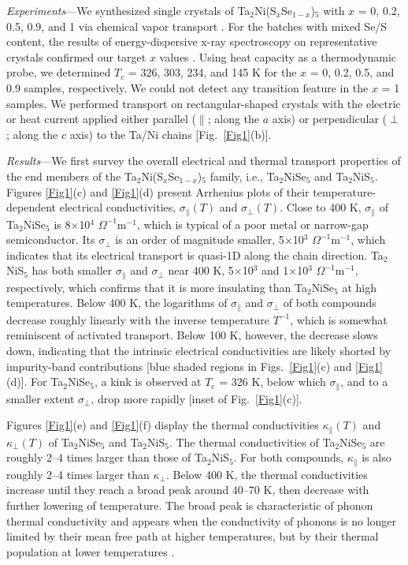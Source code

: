 \documentclass[aps,prl,twocolumn,superscriptaddress]{revtex4-2}
\begin{document}
\textit{Experiments}---We synthesized single crystals of Ta$_2$Ni(S$_x$Se$_{1-x}$)$_5$ with $x$ = 0, 0.2, 0.5, 0.9, and 1 via chemical vapor transport \cite{Lu_NatComm_2017}. For the batches with mixed Se/S content, the results of energy-dispersive x-ray spectroscopy on representative crystals confirmed our target $x$ values \cite{SM}. Using heat capacity as a thermodynamic probe, we determined $T_c$ = 326, 303, 234, and 145 K for the $x$ = 0, 0.2, 0.5, and 0.9 samples, respectively. We could not detect any transition feature in the $x$ = 1 samples. We performed transport on rectangular-shaped crystals with the electric or heat current applied either parallel ($\parallel$; along the $a$ axis) or perpendicular ($\perp$; along the $c$ axis) to the Ta/Ni chains [Fig.~\ref{Fig1}(b)].



\textit{Results}---We first survey the overall electrical and thermal transport properties of the end members of the Ta$_2$Ni(S$_x$Se$_{1-x}$)$_5$ family, i.e., Ta$_2$NiSe$_5$ and Ta$_2$NiS$_5$. Figures \ref{Fig1}(c) and \ref{Fig1}(d) present Arrhenius plots of their temperature-dependent electrical conductivities, $\sigma_\parallel(T)$ and $\sigma_\perp(T)$. Close to 400 K, $\sigma_\parallel$ of Ta$_2$NiSe$_5$ is 8$\times$10$^{4}$ $\Omega^{-1}$m$^{-1}$, which is typical of a poor metal or narrow-gap semiconductor. Its $\sigma_\perp$ is an order of magnitude smaller, 5$\times$10$^{3}$ $\Omega^{-1}$m$^{-1}$, which indicates that its electrical transport is quasi-1D along the chain direction. Ta$_2$NiS$_5$ has both smaller $\sigma_\parallel$ and $\sigma_\perp$ near 400 K, 5$\times$10$^{3}$ and 1$\times$10$^{3}$ $\Omega^{-1}$m$^{-1}$, respectively, which confirms that it is more insulating than Ta$_2$NiSe$_5$ at high temperatures. Below 400 K, the logarithms of $\sigma_\parallel$ and $\sigma_\perp$ of both compounds decrease roughly linearly with the inverse temperature $T^{-1}$, which is somewhat reminiscent of activated transport. Below 100 K, however, the decrease slows down, indicating that the intrinsic electrical conductivities are likely shorted by impurity-band contributions [blue shaded regions in Figs.~\ref{Fig1}(c) and \ref{Fig1}(d)]. For Ta$_2$NiSe$_5$, a kink is observed at $T_\textrm{c}$ = 326 K, below which $\sigma_\parallel$, and to a smaller extent $\sigma_\perp$, drop more rapidly [inset of Fig.~\ref{Fig1}(c)].

Figures \ref{Fig1}(e) and \ref{Fig1}(f) display the thermal conductivities $\kappa_{\parallel}(T)$ and $\kappa_{\perp}(T)$ of Ta$_2$NiSe$_5$ and Ta$_2$NiS$_5$. The thermal conductivities of Ta$_2$NiSe$_5$ are roughly 2--4 times larger than those of Ta$_2$NiS$_5$. For both compounds, $\kappa_{\parallel}$ is also roughly 2--4 times larger than $\kappa_{\perp}$. Below 400 K, the thermal conductivities increase until they reach a broad peak around 40--70 K, then decrease with further lowering of temperature. The broad peak is characteristic of phonon thermal conductivity and appears when the conductivity of phonons is no longer limited by their mean free path at higher temperatures, but by their thermal population at lower temperatures \cite{Tritt_2005}.
\end{document}
